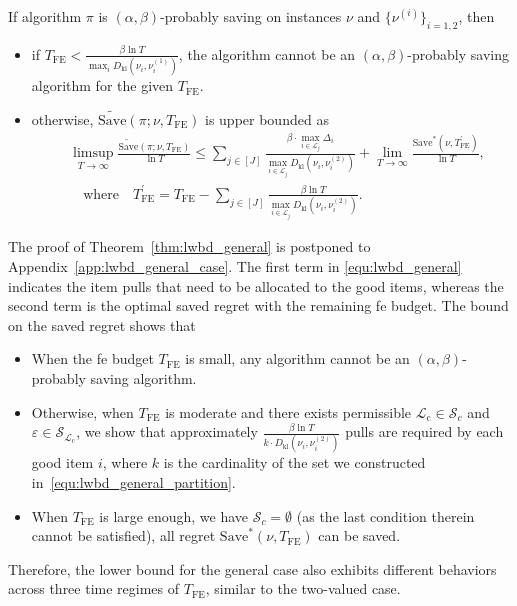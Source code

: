\documentclass[twoside,11pt]{article}
\newcommand{\kl}{D_{\mathrm{kl}}}
\newcommand{\calL}{\mathcal{L}}
\newcommand{\calS}{\mathcal{S}}
\newcommand{\rmc}{\mathrm{c}}
\newcommand{\Tfe}{T_{\mathrm{FE}}}
\newcommand{\Saved}{\mathrm{Save}}
\begin{document}
\begin{theorem}\label{thm:lwbd_general}
    If algorithm $\pi$ is $(\alpha,\beta)$-probably saving on instances $\nu$ and $\{ \nu^{(i)}\}_{  i=1,2} $, then
    \begin{itemize}[leftmargin=*]
    \item 
    if $\Tfe< \frac{\beta\ln T}{\max_i \kl(\nu_i,\nu_i^{(1)}) }$, the algorithm cannot be an $(\alpha, \beta)$-probably saving  algorithm for the given $\Tfe$. 
    \item 
    otherwise, $\widetilde{\Saved}(\pi;\nu,\Tfe)$ is upper bounded as
    \begin{align}\label{equ:lwbd_general}
             &\limsup_{T\to\infty} \frac{\widetilde{\Saved}(\pi;\nu,\Tfe)}{\ln T}
    \leq 
        \sum_{j\in[J]}\frac{\beta\cdot \max_{i\in\calL_j} \Delta_i}{\max_{i\in\calL_j} \kl(\nu_i,\nu_i^{(2)})}
        +
        \lim_{T\to\infty}\frac{\Saved^*(\nu,\Tfe^\prime)}{\ln T},
        \\
        &\quad \mbox{where}\quad
        \Tfe^\prime = \Tfe -  \sum_{j\in[J]}\frac{\beta\ln T}{\max_{i\in\calL_j} \kl(\nu_i,\nu_i^{(2)})}.
    \end{align}
    \end{itemize}
\end{theorem}
The proof of Theorem~\ref{thm:lwbd_general} is postponed to Appendix~\ref{app:lwbd_general_case}. 
The first term in \eqref{equ:lwbd_general} indicates the item pulls that need to be allocated to the good items, whereas the second term is the optimal saved regret with the remaining \ac{fe} budget.
The bound on the saved regret shows that
\begin{itemize}[leftmargin=*]
    \item When the \ac{fe} budget $\Tfe$ is small, any algorithm cannot be an $(\alpha, \beta)$-probably saving  algorithm.
    \item Otherwise, when $\Tfe$ is moderate and there exists permissible $\calL_{\rmc}\in\calS_c$ and $\varepsilon\in\calS_{\calL_{\rmc}}$, we show that approximately $\frac{\beta\ln T}{k\cdot \kl(\nu_i,\nu_i^{(2)}) }$ pulls are required by each good item $i$, where $k$ is the cardinality of the set we constructed in~\eqref{equ:lwbd_general_partition}.
    \item When $\Tfe$ is large enough, we have $\calS_c=\emptyset$ (as the last condition therein cannot be satisfied), all regret $\Saved^*(\nu,\Tfe)$ can be saved.
\end{itemize}
Therefore, the lower bound for the general case also exhibits different behaviors across three time regimes of $\Tfe$, similar to the two-valued case.
\end{document}
